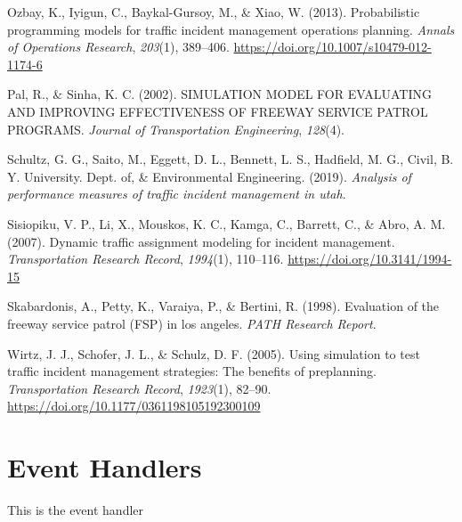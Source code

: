 \documentclass[fancy, oneside, mastersfancy, ms]{byuthesis}
\newlength{\cslhangindent}
\newlength{\cslentryspacingunit} %
\newenvironment{CSLReferences}[2] %
 {%
  \setlength{\parindent}{0pt}
  \ifodd #1
  \let\oldpar\par
  \def\par{\hangindent=\cslhangindent\oldpar}
  \fi
  \setlength{\parskip}{#2\cslentryspacingunit}
 }%
 {}
\begin{document}
\begin{CSLReferences}{1}{0}
\leavevmode{}%
Ozbay, K., Iyigun, C., Baykal-Gursoy, M., \& Xiao, W. (2013).
Probabilistic programming models for traffic incident management
operations planning. \emph{Annals of Operations Research},
\emph{203}(1), 389--406. \url{https://doi.org/10.1007/s10479-012-1174-6}

\leavevmode{}%
Pal, R., \& Sinha, K. C. (2002). {SIMULATION MODEL FOR EVALUATING AND
IMPROVING EFFECTIVENESS OF FREEWAY SERVICE PATROL PROGRAMS}.
\emph{Journal of Transportation Engineering}, \emph{128}(4).

\leavevmode{}%
Schultz, G. G., Saito, M., Eggett, D. L., Bennett, L. S., Hadfield, M.
G., Civil, B. Y. University. Dept. of, \& Environmental Engineering.
(2019). \emph{Analysis of performance measures of traffic incident
management in utah}.

\leavevmode{}%
Sisiopiku, V. P., Li, X., Mouskos, K. C., Kamga, C., Barrett, C., \&
Abro, A. M. (2007). Dynamic traffic assignment modeling for incident
management. \emph{Transportation Research Record}, \emph{1994}(1),
110--116. \url{https://doi.org/10.3141/1994-15}

\leavevmode{}%
Skabardonis, A., Petty, K., Varaiya, P., \& Bertini, R. (1998).
Evaluation of the freeway service patrol ({FSP}) in los angeles.
\emph{PATH Research Report}.

\leavevmode{}%
Wirtz, J. J., Schofer, J. L., \& Schulz, D. F. (2005). Using simulation
to test traffic incident management strategies: {The} benefits of
preplanning. \emph{Transportation Research Record}, \emph{1923}(1),
82--90. \url{https://doi.org/10.1177/0361198105192300109}

\end{CSLReferences}

\cleardoublepage
{}
{}
\appendix

\hypertarget{event-handlers}{%
\chapter{Event Handlers}\label{event-handlers}}

This is the event handler
\end{document}
